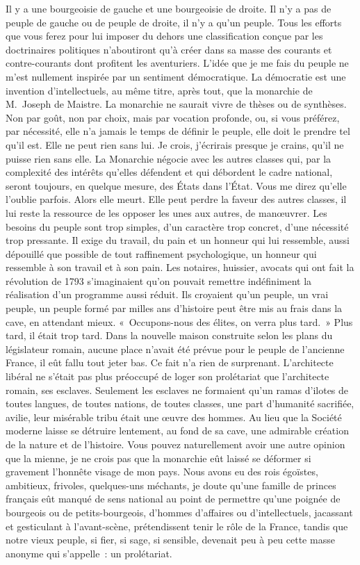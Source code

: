 \documentclass[french,twoside]{book} %
\begin{document}
\bigbreak
\noindent Il y a une bourgeoisie de gauche et une bourgeoisie de droite. Il n’y a pas de peuple de gauche ou de peuple de droite, il n’y a qu’un peuple. Tous les efforts que vous ferez pour lui imposer du dehors une classification conçue par les doctrinaires politiques n’aboutiront qu’à créer dans sa masse des courants et contre-courants dont profitent les aventuriers. L’idée que je me fais du peuple ne m’est nullement inspirée par un sentiment démocratique. La démocratie est une invention d’intellectuels, au même titre, après tout, que la monarchie de M. Joseph de Maistre. La monarchie ne saurait vivre de thèses ou de synthèses. Non par goût, non par choix, mais par vocation profonde, ou, si vous préférez, par nécessité, elle n’a jamais le temps de définir le peuple, elle doit le prendre tel qu’il est. Elle ne peut rien sans lui. Je crois, j’écrirais presque je crains, qu’il ne puisse rien sans elle. La Monarchie négocie avec les autres classes qui, par la complexité des intérêts qu’elles défendent et qui débordent le cadre national, seront toujours, en quelque mesure, des États dans l’État. Vous me direz qu’elle l’oublie parfois. Alors elle meurt. Elle peut perdre la faveur des autres classes, il lui reste la ressource de les opposer les unes aux autres, de manœuvrer. Les besoins du peuple sont trop simples, d’un caractère trop concret, d’une nécessité trop pressante. Il exige du travail, du pain et un honneur qui lui ressemble, aussi dépouillé que possible de tout raffinement psychologique, un honneur qui ressemble à son travail et à son pain. Les notaires, huissier, avocats qui ont fait la révolution de 1793 s’imaginaient qu’on pouvait remettre indéfiniment la réalisation d’un programme aussi réduit. Ils croyaient qu’un peuple, un vrai peuple, un peuple formé par milles ans d’histoire peut être mis au frais dans la cave, en attendant mieux. « Occupons-nous des élites, on verra plus tard. » Plus tard, il était trop tard. Dans la nouvelle maison construite selon les plans du législateur romain, aucune place n’avait été prévue pour le peuple de l’ancienne France, il eût fallu tout jeter bas. Ce fait n’a rien de surprenant. L’architecte libéral ne s’était pas plus préoccupé de loger son prolétariat que l’architecte romain, ses esclaves. Seulement les esclaves ne formaient qu’un ramas d’ilotes de toutes langues, de toutes nations, de toutes classes, une part d’humanité sacrifiée, avilie, leur misérable tribu était une œuvre des hommes. Au lieu que la Société moderne laisse se détruire lentement, au fond de sa cave, une admirable création de la nature et de l’histoire. Vous pouvez naturellement avoir une autre opinion que la mienne, je ne crois pas que la monarchie eût laissé se déformer si gravement l’honnête visage de mon pays. Nous avons eu des rois égoïstes, ambitieux, frivoles, quelques-uns méchants, je doute qu’une famille de princes français eût manqué de sens national au point de permettre qu’une poignée de bourgeois ou de petits-bourgeois, d’hommes d’affaires ou d’intellectuels, jacassant et gesticulant à l’avant-scène, prétendissent tenir le rôle de la France, tandis que notre vieux peuple, si fier, si sage, si sensible, devenait peu à peu cette masse anonyme qui s’appelle : un prolétariat.\par
\end{document}

